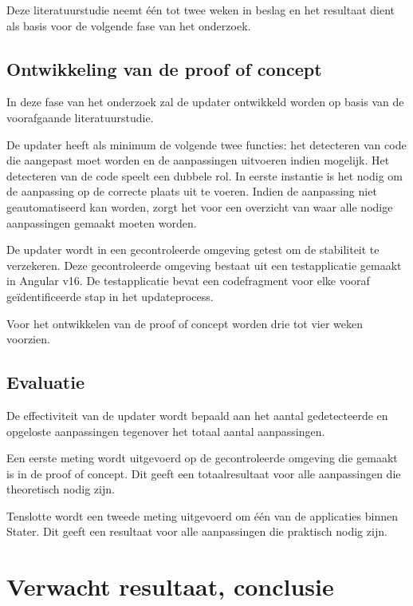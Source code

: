 Deze literatuurstudie neemt één tot twee weken in beslag en het resultaat dient als basis voor de volgende fase van het onderzoek.

\subsection{Ontwikkeling van de proof of concept}

In deze fase van het onderzoek zal de updater ontwikkeld worden op basis van de voorafgaande literatuurstudie.

De updater heeft als minimum de volgende twee functies: het detecteren van code die aangepast moet worden en de aanpassingen uitvoeren indien mogelijk.
Het detecteren van de code speelt een dubbele rol.
In eerste instantie is het nodig om de aanpassing op de correcte plaats uit te voeren.
Indien de aanpassing niet geautomatiseerd kan worden, zorgt het voor een overzicht van waar alle nodige aanpassingen gemaakt moeten worden.

De updater wordt in een gecontroleerde omgeving getest om de stabiliteit te verzekeren.
Deze gecontroleerde omgeving bestaat uit een testapplicatie gemaakt in Angular v16.
De testapplicatie bevat een codefragment voor elke vooraf geïdentificeerde stap in het updateprocess.

Voor het ontwikkelen van de proof of concept worden drie tot vier weken voorzien.

\subsection{Evaluatie}

De effectiviteit van de updater wordt bepaald aan het aantal gedetecteerde en opgeloste aanpassingen tegenover het totaal aantal aanpassingen.

Een eerste meting wordt uitgevoerd op de gecontroleerde omgeving die gemaakt is in de proof of concept.
Dit geeft een totaalresultaat voor alle aanpassingen die theoretisch nodig zijn.

Tenslotte wordt een tweede meting uitgevoerd om één van de applicaties binnen Stater.
Dit geeft een resultaat voor alle aanpassingen die praktisch nodig zijn.

\section{Verwacht resultaat, conclusie}
\label{sec:verwachte_resultaten}

